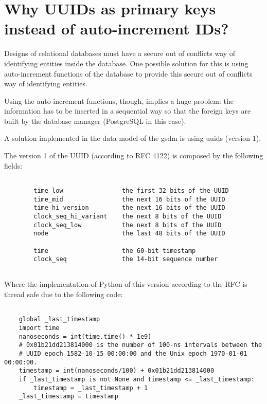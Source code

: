 \chapter{Why UUIDs as primary keys instead of auto-increment IDs?}

Designs of relational databases must have a secure out of conflicts way of identifying entities inside the database. One possible solution for this is using auto-increment functions of the database to provide this secure out of conflicts way of identifying entities.

Using the auto-increment functions, though, implies a huge problem: the information has to be inserted in a sequential way so that the foreign keys are built by the database manager (PostgreSQL in this case).

A solution implemented in the data model of the \acrshort{gsdm} is using \acrshort{uuid}s (version 1).

The version 1 of the UUID (according to RFC 4122) is composed by the following fields: 

\begin{lstlisting}[breaklines=true, style=c, caption={XML input example for showing the values structure management.}]

        time_low                the first 32 bits of the UUID
        time_mid                the next 16 bits of the UUID
        time_hi_version         the next 16 bits of the UUID
        clock_seq_hi_variant    the next 8 bits of the UUID
        clock_seq_low           the next 8 bits of the UUID
        node                    the last 48 bits of the UUID

        time                    the 60-bit timestamp
        clock_seq               the 14-bit sequence number
        
\end{lstlisting}

Where the implementation of Python of this version according to the RFC is thread safe due to the following code:

\begin{lstlisting}[breaklines=true, style=c, caption={Python code showing how the algorithm provides a mechanism for using UUIDs in a thread safe manner.}]

    global _last_timestamp
    import time
    nanoseconds = int(time.time() * 1e9)
    # 0x01b21dd213814000 is the number of 100-ns intervals between the
    # UUID epoch 1582-10-15 00:00:00 and the Unix epoch 1970-01-01 00:00:00.
    timestamp = int(nanoseconds/100) + 0x01b21dd213814000
    if _last_timestamp is not None and timestamp <= _last_timestamp:
        timestamp = _last_timestamp + 1
    _last_timestamp = timestamp
    
\end{lstlisting}

